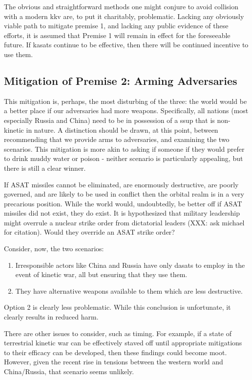 The obvious and straightforward methods one might conjure to avoid
collision with a modern \ac{kkv} are, to put it charitably,
problematic.  Lacking any obviously viable path to mitigate premise 1,
and lacking any public evidence of these efforts, it is assumed that
Premise 1 will remain in effect for the foreseeable future.  If
\acp{kasat} continue to be effective, then there will be continued
incentive to use them.

\subsection{Mitigation of Premise 2: Arming Adversaries}
This mitigation is, perhaps, the most disturbing of the three: the
world would be a better place if our adversaries had more weapons.
Specifically, all nations (most especially Russia and China) need to
be in possession of a \acf{ssup} that is non-kinetic in nature.  A
distinction should be drawn, at this point, between recommending that
we provide arms to adversaries, and examining the two scenarios.  This
mitigation is more akin to asking if someone if they would prefer to
drink muddy water or poison - neither scenario is particularly
appealing, but there is still a clear winner.

If ASAT missiles cannot be eliminated, are enormously destructive, are
poorly governed, and are likely to be used in conflict then the
orbital realm is in a very precarious position.  While the world
would, undoubtedly, be better off if ASAT missiles did not exist, they
do exist.  It is hypothesized that military leadership might overrule
a nuclear strike order from dictatorial leaders (XXX: ask michael for
citation).  Would they override an ASAT strike order?

Consider, now, the two scenarios:

\begin{enumerate}
\item Irresponsible actors like China and Russia have only \acp{dasat}
  to employ in the event of kinetic war, all but ensuring that they
  use them.

\item They have alternative weapons available to them which are less
  destructive.
\end{enumerate}

Option 2 is clearly less problematic.  While this conclusion is
unfortunate, it clearly results in reduced harm.

There are other issues to consider, such as timing.  For example, if a
state of terrestrial kinetic war can be effectively staved off until
appropriate mitigations to their efficacy can be developed, then these
findings could become moot.  However, given the recent rise in
tensions between the western world and China/Russia, that scenario
seems unlikely.

